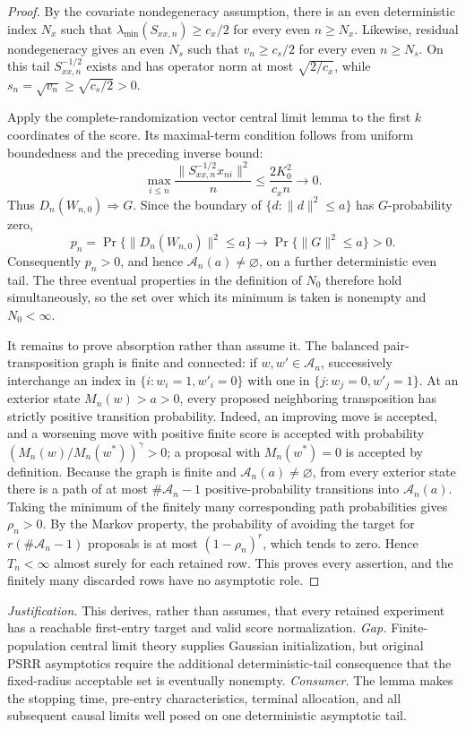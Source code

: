 \documentclass{article}
\begin{document}
\begin{proof}
By the covariate nondegeneracy assumption, there is an even deterministic index \(N_x\) such that \(\lambda_{\min}(S_{xx,n})\ge c_x/2\) for every even \(n\ge N_x\).  Likewise, residual nondegeneracy gives an even \(N_s\) such that \(v_n\ge c_s/2\) for every even \(n\ge N_s\).  On this tail \(S_{xx,n}^{-1/2}\) exists and has operator norm at most \(\sqrt{2/c_x}\), while \(s_n=\sqrt{v_n}\ge\sqrt{c_s/2}>0\).

Apply the complete-randomization vector central limit lemma to the first \(k\) coordinates of the score.  Its maximal-term condition follows from uniform boundedness and the preceding inverse bound:
\[
 \max_{i\le n}\frac{\|S_{xx,n}^{-1/2}x_{ni}\|^2}{n}
 \le \frac{2K_0^2}{c_x n}\longrightarrow0.
\]
Thus \(D_n(W_{n,0})\Rightarrow G\).  Since the boundary of \(\{d:\|d\|^2\le a\}\) has \(G\)-probability zero,
\[
 p_n=\Pr\{\|D_n(W_{n,0})\|^2\le a\}
 \longrightarrow \Pr\{\|G\|^2\le a\}>0.
\]
Consequently \(p_n>0\), and hence \(\mathcal A_n(a)\ne\varnothing\), on a further deterministic even tail.  The three eventual properties in the definition of \(N_0\) therefore hold simultaneously, so the set over which its minimum is taken is nonempty and \(N_0<\infty\).

It remains to prove absorption rather than assume it.  The balanced pair-transposition graph is finite and connected: if \(w,w'\in\mathcal A_n\), successively interchange an index in \(\{i:w_i=1,w'_i=0\}\) with one in \(\{j:w_j=0,w'_j=1\}\).  At an exterior state \(M_n(w)>a>0\), every proposed neighboring transposition has strictly positive transition probability.  Indeed, an improving move is accepted, and a worsening move with positive finite score is accepted with probability \((M_n(w)/M_n(w^*))^\gamma>0\); a proposal with \(M_n(w^*)=0\) is accepted by definition.  Because the graph is finite and \(\mathcal A_n(a)\ne\varnothing\), from every exterior state there is a path of at most \(\#\mathcal A_n-1\) positive-probability transitions into \(\mathcal A_n(a)\).  Taking the minimum of the finitely many corresponding path probabilities gives \(\rho_n>0\).  By the Markov property, the probability of avoiding the target for \(r(\#\mathcal A_n-1)\) proposals is at most \((1-\rho_n)^r\), which tends to zero.  Hence \(T_n<\infty\) almost surely for each retained row.  This proves every assertion, and the finitely many discarded rows have no asymptotic role.
\end{proof}
\par\smallskip\noindent \textit{Justification.} This derives, rather than assumes, that every retained experiment has a reachable first-entry target and valid score normalization. \textit{Gap.} Finite-population central limit theory supplies Gaussian initialization, but original PSRR asymptotics require the additional deterministic-tail consequence that the fixed-radius acceptable set is eventually nonempty. \textit{Consumer.} The lemma makes the stopping time, pre-entry characteristics, terminal allocation, and all subsequent causal limits well posed on one deterministic asymptotic tail.
\end{document}
